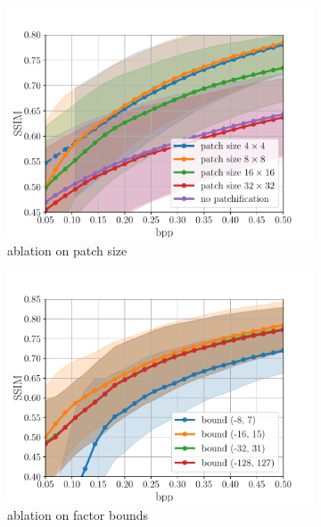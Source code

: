 \begin{figure}[t]
	\centering
	\begin{subfigure}{.45\textwidth}
		\centering
		\includegraphics[width=.95\textwidth]{figures/ablation_patchsize_ssim.pdf}
		\caption{ablation on patch size}
		\label{fig: patch ablation ssim-vs-bpp}
	\end{subfigure}%
	\begin{subfigure}{.45\textwidth}
		\centering
		\includegraphics[width=.95\textwidth]{figures/ablation_bounds_ssim.pdf}
		\caption{ablation on factor bounds}
		\label{fig: bounds ablation ssim-vs-bpp}
	\end{subfigure}
    \begin{subfigure}{.45\textwidth}
		\centering

\end{subfigure}
\end{figure}

